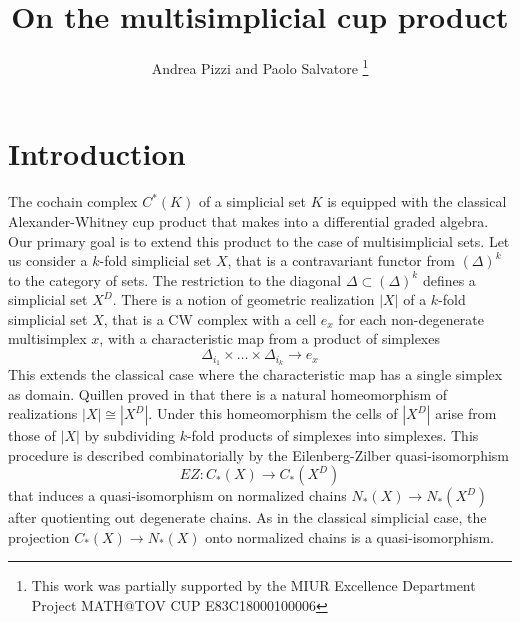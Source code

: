 \documentclass[a4paper,11pt]{article}
\theoremstyle{remark}
\theoremstyle{definition}
\begin{document}
\title{On the multisimplicial cup product}
\date{}
\author{Andrea Pizzi and Paolo Salvatore  \footnote{This work was partially supported  
by the MIUR Excellence Department Project MATH@TOV CUP E83C18000100006}
 }

	
\maketitle



	
\section{Introduction}

The cochain complex $C^*(K)$ of a simplicial set $K$ is equipped with the classical Alexander-Whitney cup product that makes into a
differential graded algebra.
Our primary goal is to extend this product to the case of multisimplicial sets.  Let us consider a $k$-fold simplicial set $X$, that is a contravariant functor from $(\Delta)^k$ to the category of sets. The restriction to the diagonal  $\Delta \subset (\Delta)^k$ defines a simplicial set $X^D$. There is a notion 
of geometric realization $|X|$ of a $k$-fold simplicial set $X$, that is a CW complex with a cell $e_x$ for each non-degenerate multisimplex $x$, with a characteristic map from a product of simplexes  $$\Delta_{i_1} \times \dots \times \Delta_{i_k} \to e_x$$ This extends the classical case where the characteristic map has a single simplex as domain. 
Quillen proved in 
\cite{Quillen} that there is  a natural homeomorphism of realizations $|X| \cong |X^D|$. Under this homeomorphism the cells of $|X^D|$ arise from those
of $|X|$ by subdividing $k$-fold products of simplexes into simplexes. This procedure is described combinatorially by the Eilenberg-Zilber quasi-isomorphism $$EZ:C_*(X) \to C_*(X^D)$$ that induces a quasi-isomorphism on normalized chains 
$N_*(X) \to N_*(X^D)$ after quotienting out degenerate chains.
 As in the classical simplicial case, the projection $C_*(X) \to N_*(X)$ onto normalized chains 
is a quasi-isomorphism.

\medskip
\end{document}
